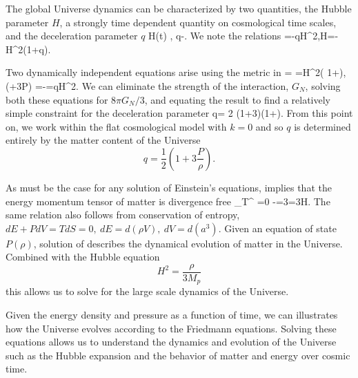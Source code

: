 The global Universe dynamics can be characterized by two  quantities, the Hubble parameter  $H$, a strongly time dependent quantity on cosmological time scales,  and the deceleration parameter $q$
\beqn\label{dynamic}
\equiv H(t) ,\quad 
q\equiv -.
\eeqn
We note the relations
\beqn
\quad {}=-qH^2,\quad \dot H=-H^2(1+q). 
\eeqn

Two dynamically independent equations arise using the metric  in 
\beqn\label{hubble}
 \rho =  
=H^2\left( 1+\right),
\qquad
{} (\rho+3P)  =-=qH^2.
\eeqn
We can eliminate the strength of the interaction, $G_N$,  solving both these equations for ${8\pi G_N}/{3}$, and equating the result to find a relatively simple constraint for the deceleration parameter
\beqn\label{qparam}
q= 2 \left(1+3\right)\left(1+\right).
\eeqn
 From this point on, we work within the  flat cosmological model with $k=0$ and so $q$ is determined entirely by the matter content of the Universe
\begin{equation}\label{qparam}
q=\frac 1 2 \left(1+3\frac{P}{\rho}\right).
\end{equation}


As must be the case for any solution of Einstein's equations,    implies that the energy momentum tensor of matter is divergence free
\beqn\label{divTmn}
\nabla_\nu T^{\mu\nu} =0 \Rightarrow -=3=3H.
\eeqn
 The same relation also follows from  conservation of entropy, $dE+PdV=TdS=0,\  dE=d(\rho V),\  dV=d(a^3)$. Given an equation of state $P(\rho)$, solution of  describes the dynamical evolution of matter in the Universe. Combined with the Hubble equation
\begin{equation}\label{Hubble_eq}
H^2=\frac{\rho}{3M_p}
\end{equation}
this allows us to solve for the large scale dynamics of the Universe. 

Given the energy density and pressure as a function of time, we can illustrates how the Universe evolves according to the Friedmann equations. Solving these equations allows us to understand the dynamics and evolution of the Universe such as the Hubble expansion and the behavior of matter and energy over cosmic time.




 



